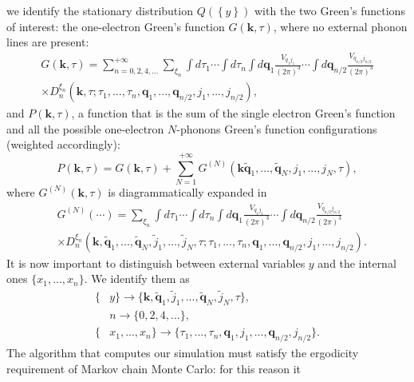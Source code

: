 we identify the stationary distribution $Q(\left\{y\right\})$ with the two Green's functions of interest: the one-electron Green's function 
$G(\mathbf{k},\tau)$, where no external phonon lines are present:
\begin{equation}
\begin{split}
    G(\mathbf{k},\tau)=\sum_{n=0,2,4,...}^{+\infty}\sum_{\xi_n}\int d\tau_1\cdots \int d\tau_n\int d\mathbf{q}_1 \frac{V_{q_1j_1}}{(2\pi)^3}\cdots\int d\mathbf{q}_{n/2}\frac{V_{q_{n/2}j_{n/2}}}{(2\pi)^3} \\
    \times D_n^{\xi_n}(\mathbf{k},\tau;\tau_1,...,\tau_{n},\mathbf{q}_1,...,\mathbf{q}_{n/2},j_1,...,j_{n/2}),
\end{split}
\end{equation}
and $P(\mathbf{k},\tau)$, a function that is the sum of the single electron Green's function and all the possible one-electron $N$-phonons Green's function 
configurations (weighted accordingly):
\begin{equation}
    P(\mathbf{k},\tau)=G(\mathbf{k},\tau)+\sum_{N=1}^{+\infty}G^{(N)}(\mathbf{k}\tilde{\mathbf{q}}_1,...,\tilde{\mathbf{q}}_N, j_1,...,j_N,\tau),
\end{equation}
where $G^{(N)}(\mathbf{k},\tau)$ is diagrammatically expanded in 
\begin{equation}
\begin{split}
   &G^{(N)}(\cdots)=\sum_{\xi_n}\int d\tau_1\cdots \int d\tau_n\int d\mathbf{q}_1\frac{V_{q_1j_1}}{(2\pi)^3}\cdots\int d\mathbf{q}_{n/2}\frac{V_{q_{n/2}j_{n/2}}}{(2\pi)^3}\\
    &\times D_n^{\xi_n}(\mathbf{k},\tilde{\mathbf{q}}_1,...,\tilde{\mathbf{q}}_N,\tilde{j}_1,...,\tilde{j}_N,\tau;\tau_1,...,\tau_n,\mathbf{q}_1,...,\mathbf{q}_{n/2},j_1,...,j_{n/2}).
\end{split}
\end{equation}
It is now important to distinguish between external variables ${y}$ and the internal ones $\{x_1,...,x_n\}$. We identify them as
\begin{equation}
\begin{split}
    \{&y\}\to \{\mathbf{k},\tilde{\mathbf{q}}_1,\tilde{j}_1,...,\tilde{\mathbf{q}}_N,\tilde{j}_N, \tau \},\\
    &n\to \{0,2,4,...\},\\
    \{&x_1,...,x_n\}\to \{\tau_1,...,\tau_n, \mathbf{q}_1, j_1,..., \mathbf{q}_{n/2}, j_{n/2}\}.
\end{split}
\end{equation}
The algorithm that computes our simulation must satisfy the ergodicity requirement of Markov chain Monte Carlo: for this reason it 
